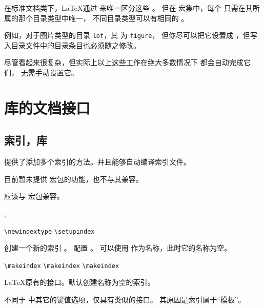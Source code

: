 \documentclass{cusdoc}
\begin{document}
在标准文档类下，\LaTeX 通过  来唯一区分这些 。
但在 \CusTeX 宏集中，每个  只需在其所属的那个目录类型中唯一，
不同目录类型可以有相同的 。

例如，对于图片类型的目录 \texttt{lof}，其  为 \texttt{figure}，
但你尽可以把它设置成 ，但写入目录文件中的目录条目也必须随之修改。

尽管看起来很复杂，但实际上以上这些工作在绝大多数情况下 \CusTeX 都会自动完成它们，
无需手动设置它。


\chapter{库的文档接口}

\section{索引，库}

\CusTeX 提供了添加多个索引的方法。并且能够自动编译索引文件。

目前暂未提供  宏包的功能，也不与其兼容。

应该与  宏包兼容。

\begin{function}{\newindextype,\setupindex}
  \begin{syntax}
    \verb|\newindextype|  
    \verb|\setupindex|    
  \end{syntax}
 创建一个新的索引 。
 配置 。
 可以使用  作为名称，此时它的名称为空。
\end{function}

\begin{function}{\makeindex}
  \begin{syntax}
    \verb|\makeindex|
    \verb|\makeindex| 
    \verb|\makeindex|  
  \end{syntax}
\LaTeX 原有的接口。默认创建名称为空的索引。
\end{function}

 不同于 \CusTeX 中其它的键值选项，仅具有类似的接口。
其原因是索引属于“模板”。
\end{document}
